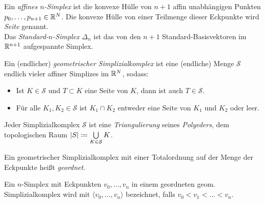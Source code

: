 \documentclass{cheat-sheet}
\newcommand{\angles}[1]{{\langle #1 \rangle}}
\newcommand{\Simpl}{\mathcal{S}} %
\newcommand{\Real}[1]{\abs{#1}} %
\begin{document}






\begin{defn}
  Ein \emph{affines $n$-Simplex} ist die konvexe Hülle von $n+1$ affin unabhängigen Punkten $p_0, \ldots, p_{n+1} \in \mathbb{R}^N$. Die konvexe Hülle von einer Teilmenge dieser Eckpunkte wird \emph{Seite} genannt.\\
  Das \emph{Standard-$n$-Simplex} $\Delta_n$ ist das von den $n+1$ Standard-Basisvektoren im $\mathbb{R}^{n+1}$ aufgespannte Simplex.
\end{defn}

\begin{defn}
  Ein (endlicher) \emph{geometrischer Simplizialkomplex} ist eine (endliche) Menge $\mathcal{S}$ endlich vieler affiner Simplizes im $\mathbb{R}^N$, sodass:
  \begin{itemize}
    \item Ist $K \in \Simpl$ und $T \subset K$ eine Seite von $K$, dann ist auch $T \in \Simpl$.
    \item Für alle $K_1, K_2 \in \Simpl$ ist $K_1 \cap K_2$ entweder eine Seite von $K_1$ und $K_2$ oder leer.
  \end{itemize}
\end{defn}

\begin{defn}
  Jeder Simplizialkomplex $\Simpl$ ist eine \emph{Triangulierung} seines \emph{Polyeders}, dem topologischen Raum $\Real{S} \coloneqq \bigcup_{K \in \Simpl} K$.
\end{defn}

\begin{defn}
  Ein geometrischer Simplizialkomplex mit einer Totalordnung auf der Menge der Eckpunkte heißt \emph{geordnet}.
\end{defn}

\begin{nota}
  Ein $n$-Simplex mit Eckpunkten $v_0, \ldots, v_n$ in einem geordneten geom. Simplizialkomplex wird mit $\angles{v_0, \ldots, v_n}$ bezeichnet, falls $v_0 < v_1 < \ldots < v_n$.
\end{nota}
\end{document}
